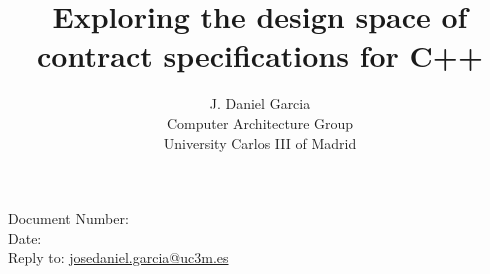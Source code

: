 \documentclass[10pt,a4paper,oneside,final,notitlepage]{article}%
\begin{document}


\begin{flushright}
Document Number: \texttt{\paperid}\\
Date: \paperdate\\
Reply to: \url{josedaniel.garcia@uc3m.es}
\end{flushright}

\title{Exploring the design space of contract specifications for C++}
\author{J. Daniel Garcia\\
Computer Architecture Group\\
University Carlos III of Madrid\\
}
\date{}

\begingroup
\let\newpage\relax%
\maketitle
\endgroup












\end{document}
